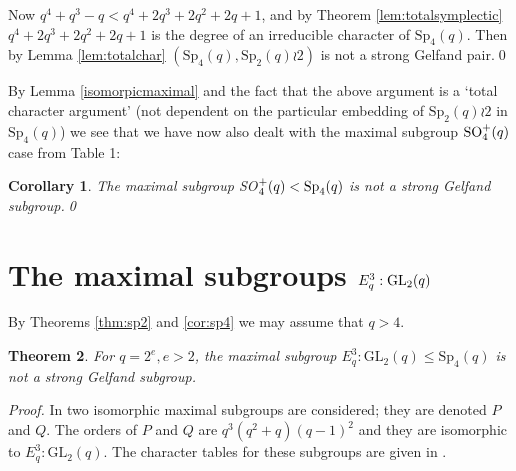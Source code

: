 \documentclass{amsart}
\newtheorem{thm}{Theorem}[section]
\newtheorem{cor}[thm]{Corollary}
\begin{document}
Now $q^4+q^3-q < q^4+2q^3+2q^2+2q+1$, and  by Theorem  \ref{lem:totalsymplectic}   $q^4+2q^3+2q^2+2q+1$ is the degree of an irreducible character of $\mathrm{Sp}_4(q)$. Then by Lemma \ref{lem:totalchar}  $(\mathrm{Sp}_4(q), \mathrm{Sp}_2(q)\wr 2)$ is not a strong Gelfand pair.\qed\medskip 

By Lemma \ref {isomorpicmaximal} and the fact that the above argument is a `total character argument' (not dependent on the particular embedding of $ \mathrm{Sp}_2(q)\wr 2$ in $\mathrm{Sp}_4(q)$)        we see that we have now also dealt with  the maximal subgroup ${\rm SO}^+_4(q)$ case from Table 1:

\begin{cor} \label{cor1} The maximal subgroup {\rm SO}$^+_4(q)<{\rm Sp}_4(q)$ is not a strong Gelfand subgroup.\qed
\end{cor}\medskip
 


\section {The maximal subgroups $E_q^3:{\rm GL}_2(q)$}

By Theorems \ref {thm:sp2} and \ref {cor:sp4}  we may assume that $q>4$.
\begin{thm}\label{thm:elementaryabelian}
For $q=2^e, e>2$, the maximal subgroup $E_q^3\colon\mathrm{GL}_2(q) \leq \mathrm{Sp}_4(q)$ is not a strong Gelfand subgroup.
\end{thm}
\noindent\textit{Proof.} In \cite{speven} two isomorphic maximal subgroups are considered; they are denoted $P$ and $Q$. 
The orders of $P$ and $Q$ are $q^3(q^2+q)(q-1)^2$ and they are isomorphic to  $E_q^3\colon\mathrm{GL}_2(q)$. The character tables for these subgroups are given in \cite{speven}. 
\end{document}
